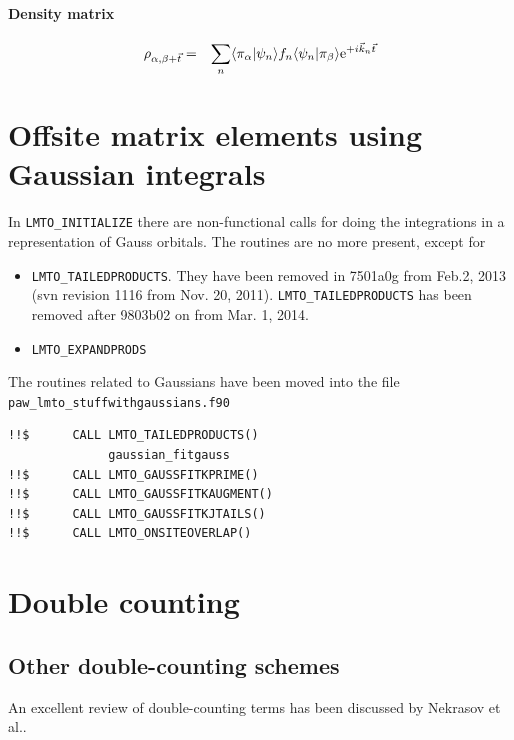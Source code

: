 \documentclass[11pt,a4paper]{report}
\begin{document}
\subsubsection{Density matrix}
\begin{eqnarray}
\rho_{\alpha,\beta+\vec{t}}
&=&
\sum_n \langle\pi_\alpha|\psi_n\rangle f_n
\langle\psi_n|\pi_\beta\rangle
\mathrm{e}^{+i\vec{k}_n\vec{t}}
\end{eqnarray}

\chapter{Offsite matrix elements using Gaussian integrals}
In \verb|LMTO_INITIALIZE| there are non-functional calls for doing the
integrations in a representation of Gauss orbitals. The routines are
no more present, except for 
\begin{itemize}
\item \verb|LMTO_TAILEDPRODUCTS|. They have been
removed in 7501a0g from Feb.2, 2013 (svn revision 1116 from Nov. 20,
2011). \verb|LMTO_TAILEDPRODUCTS| has been removed after 9803b02 on from
 Mar. 1, 2014.
\item \verb|LMTO_EXPANDPRODS|
\end{itemize}

The routines related to Gaussians have been moved into the file
\verb|paw_lmto_stuffwithgaussians.f90|

\begin{verbatim}
!!$      CALL LMTO_TAILEDPRODUCTS()
              gaussian_fitgauss
!!$      CALL LMTO_GAUSSFITKPRIME()
!!$      CALL LMTO_GAUSSFITKAUGMENT()
!!$      CALL LMTO_GAUSSFITKJTAILS()
!!$      CALL LMTO_ONSITEOVERLAP()
\end{verbatim}

\chapter{Double counting}
\label{app:dc}
\section{Other double-counting schemes}
An excellent review of double-counting terms has been discussed by
Nekrasov et al.\cite{nekrasov12_arxiv1208_4732}.  
\end{document}
